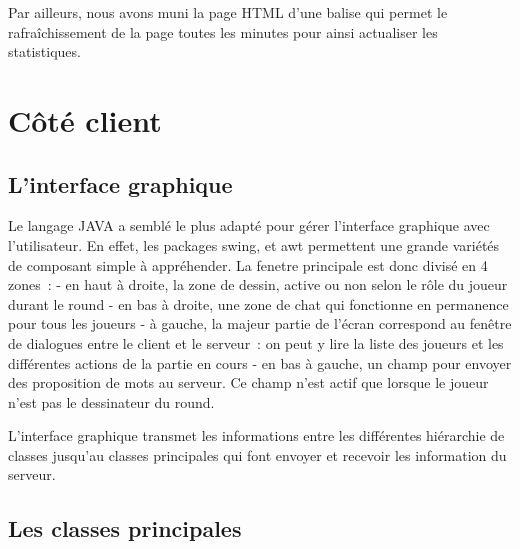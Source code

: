 \documentclass[a4paper, 11pt]{article}
\begin{document}
\bigskip Par ailleurs, nous avons muni la page HTML d’une balise qui
permet le rafraîchissement de la page toutes les minutes pour ainsi
actualiser les statistiques.

\section{Côté client}

\subsection {L'interface graphique}

Le langage JAVA a semblé le plus adapté pour gérer l'interface graphique
avec l'utilisateur. En effet, les packages swing, et  awt permettent une
grande variétés de composant simple à appréhender.
La fenetre principale est donc divisé en 4 zones :
 - en haut à droite, la zone de dessin, active ou non selon le rôle du joueur durant le round
 - en bas à droite, une zone de chat qui fonctionne en permanence pour tous les joueurs
 - à gauche, la majeur partie de l’écran correspond au fenêtre de dialogues
entre le client et le serveur : on peut y lire la liste des joueurs et les différentes actions de la partie en cours
 - en bas à gauche, un champ pour envoyer des proposition de mots
   au serveur. Ce champ n'est actif que lorsque le joueur n'est pas le dessinateur du round.

L'interface graphique transmet les informations entre les différentes
hiérarchie de classes jusqu'au classes principales qui font envoyer
et recevoir les information du serveur.

\subsection{Les classes principales}
\end{document}
